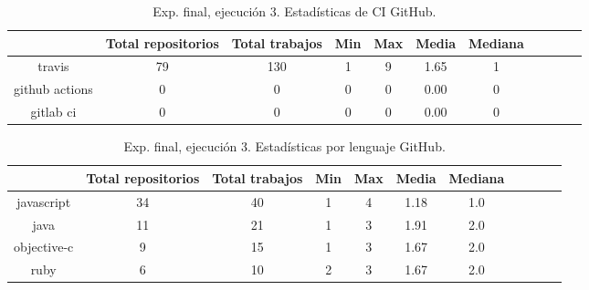 \begin{table}
  \centering
  \caption{Exp. final, ejecución 3. Estadísticas de CI GitHub.}
  \label{tab:tabla_f3_3}

\begin{footnotesize}
\renewcommand{\arraystretch}{1.5} %
\begin{tabular}{ccccccccccc}
  \hline
  {} &  Total repositorios &  Total trabajos &  Min &  Max &  Media &  Mediana \\
  \hline
  travis         &         79 &         130 &    1 &    9 &   1.65 &        1 \\
  github actions &          0 &           0 &    0 &    0 &   0.00 &        0 \\
  gitlab ci      &          0 &           0 &    0 &    0 &   0.00 &        0 \\
 \end{tabular}
\end{footnotesize}

\end{table}

\begin{table}
  \centering
  \caption{Exp. final, ejecución 3. Estadísticas por lenguaje GitHub.}
  \label{tab:tabla_f3_4}

\begin{footnotesize}
\renewcommand{\arraystretch}{1.5} %
\begin{tabular}{ccccccccccc}
  \hline
  {} &  Total repositorios &  Total trabajos &  Min &  Max &  Media &  Mediana \\
  \hline
  javascript   &         34 &          40 &    1 &    4 &   1.18 &      1.0 \\
  java         &         11 &          21 &    1 &    3 &   1.91 &      2.0 \\
  objective-c  &          9 &          15 &    1 &    3 &   1.67 &      2.0 \\
  ruby         &          6 &          10 &    2 &    3 &   1.67 &      2.0 \\
 \end{tabular}
\end{footnotesize}

\end{table}

